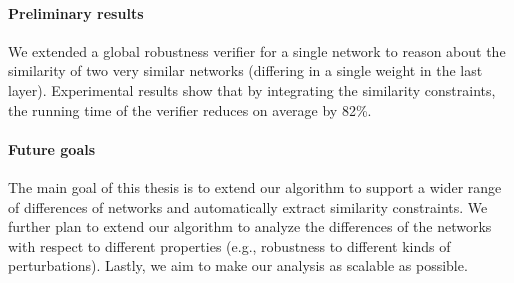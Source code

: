\paragraph{Preliminary results}
We extended a global robustness verifier for a single network
to reason about the similarity of two very similar networks (differing in a single weight in the last layer).
Experimental results show that by integrating the similarity constraints, the running time of the verifier reduces on average by 82\%.


\paragraph{Future goals}
The main goal of this thesis is to extend our algorithm to support a wider range of differences of networks and automatically extract similarity constraints. We further plan to extend our algorithm to analyze the differences of the networks with respect to different properties (e.g., robustness to different kinds of perturbations). Lastly, we aim to make our analysis as scalable as possible.
